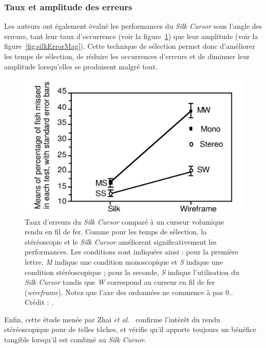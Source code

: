	\subsubsection{Taux et amplitude des erreurs}
	Les auteurs ont également évalué les performances du \emph{Silk Cursor} sous l'angle des erreurs, tant leur taux d'occurrence (voir la figure~\ref{fig:silkErrors}) que leur amplitude (voir la figure~\ref{fig:silkErrorMag}). Cette technique de sélection permet donc d'améliorer les temps de sélection, de réduire les occurrences d'erreurs et de diminuer leur amplitude lorsqu'elles se produisent malgré tout.
	
	\begin{figure}[ht]
		\centering
		\includegraphics[width=\textwidth]{figures/ch2/silkErrors}
		\caption[Taux d'erreurs du \emph{Silk Cursor}]{Taux d'erreurs du \emph{Silk Cursor} comparé à un curseur volumique rendu en fil de fer. Comme pour les temps de sélection, la stéréoscopie et le \emph{Silk Cursor} améliorent significativement les performances. Les conditions sont indiquées ainsi : pour la première lettre, \emph{M} indique une condition monoscopique et \emph{S} indique une condition stéréoscopique ; pour la seconde, \emph{S} indique l'utilisation du \emph{Silk Cursor} tandis que \emph{W} correspond au curseur en fil de fer (\emph{wireframe}). Notez que l'axe des ordonnées ne commence à pas $0$.. Crédit : \cite{zhai1994silk}.}
		\label{fig:silkErrors}
	\end{figure}
	
	Enfin, cette étude menée par Zhai \emph{et al.}~\cite{zhai1994silk} confirme l'intérêt du rendu stéréoscopique pour de telles tâches, et vérifie qu'il apporte toujours un bénéfice tangible lorsqu'il est combiné au \emph{Silk Cursor}.
	
